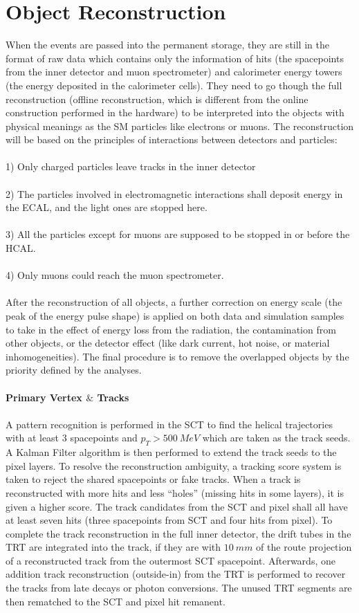 \section{Object Reconstruction}
\label{sec:obj rec}
When the events are passed into the permanent storage, they are still in the format of raw data which contains only the information of hits (the spacepoints from the inner detector and muon spectrometer) and calorimeter energy towers (the energy deposited in the calorimeter cells). They need to go though the full reconstruction (offline reconstruction, which is different from the online construction performed in the hardware) to be interpreted into the objects with physical meanings as the SM particles like electrons or muons. The reconstruction will be based on the principles of interactions between detectors and particles: 
\\
\\1) Only charged particles leave tracks in the inner detector
\\
\\2) The particles involved in electromagnetic interactions shall deposit energy in the ECAL, and the light ones are stopped here.
\\
\\3) All the particles except for muons are supposed to be stopped in or before the HCAL.
\\
\\4) Only muons could reach the muon spectrometer. 
\\
\\After the reconstruction of all objects, a further correction on energy scale (the peak of the energy pulse shape) is applied on both data and simulation samples to take in  the effect of energy loss from the radiation, the contamination from other objects, or the detector effect (like dark current, hot noise, or material inhomogeneities). The final procedure is to remove the overlapped objects by the priority defined by the analyses. 
\\
\\{\bf Primary Vertex $\&$ Tracks \cite{Aaboud:2017all}}
\\
\\A pattern recognition is performed in the SCT to find the helical trajectories with at least 3 spacepoints and $p_{T}>500~MeV$ which are taken as the track seeds. A Kalman Filter algorithm is then performed to extend the track seeds to the pixel layers. To resolve the reconstruction ambiguity, a tracking score system is taken to reject the shared spacepoints or fake tracks. When a track is reconstructed with more hits and less ``holes'' (missing hits in some layers), it is given a higher score. The track candidates from the SCT and pixel shall all have at least seven hits (three spacepoints from SCT and four hits from pixel). To complete the track reconstruction in the full inner detector, the drift tubes in the TRT are integrated into the track, if they are with $10~mm$ of the route projection of a reconstructed track from the outermost SCT spacepoint. Afterwards, one addition track reconstruction (outside-in) from the TRT is performed to recover the tracks from late decays or photon conversions. The unused TRT segments are then rematched to the SCT and pixel hit remanent.   
